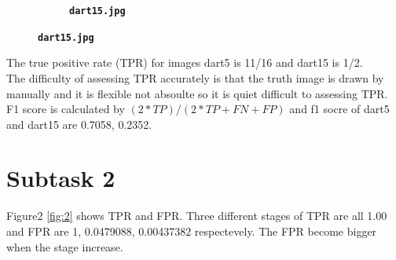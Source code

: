 \documentclass[12pt]{article}
\begin{document}
\begin{figure}[htb]
\begin{subfigure}[b]{.68\linewidth}
  \caption{\textbf{\texttt{dart15.jpg}}}
\end{subfigure}
\label{fig:1}
\end{figure}


The true positive rate (TPR) for images dart5 is 11/16 and dart15 is 1/2.\\

The difficulty of assessing TPR accurately is that the truth image is drawn by manually and it is flexible not  absoulte so it is quiet difficult to assessing TPR.\\

F1 score is calculated by $(2*TP)/(2*TP+FN+FP)$  and f1 socre of dart5 and dart15 are 0.7058, 0.2352.\\

\clearpage

\section{Subtask 2}


Figure2 \ref{fig:2} shows TPR and FPR. Three different stages of TPR are all 1.00 and 
FPR are 1, 0.0479088, 0.00437382 respectevely. The FPR become bigger when the stage increase.
\end{document}
